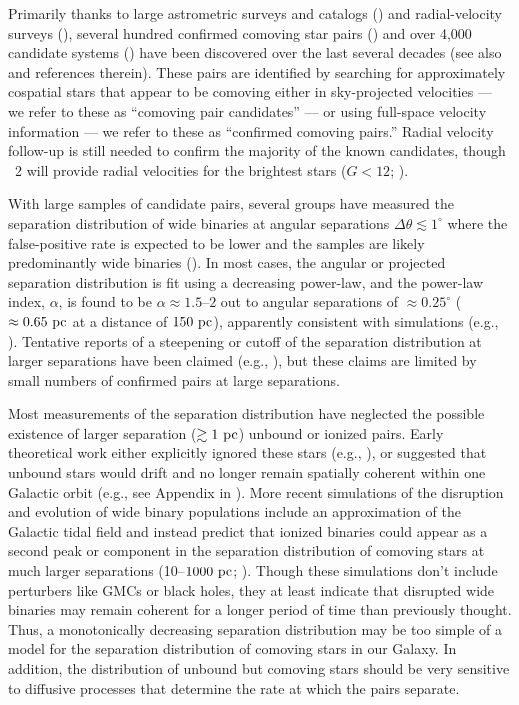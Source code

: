 \documentclass[modern, letterpaper]{aastex61}
\newcommand{\gaia}{\project{Gaia}}
\newcommand{\DR}[1]{\acronym{DR}#1}
\begin{document}
Primarily thanks to large astrometric surveys and catalogs
(\citealt{ESA:1997,Lepine:2005,Gaia-Collaboration:2016}) and radial-velocity
surveys (\citealt{Steinmetz:2006}), several hundred confirmed comoving star
pairs (\citealt{Shaya:2011}) and over 4,000 candidate systems
(\citealt{Gould:2004,Lepine:2007,Tokovinin:2012,Allen:2014,Oh:2017,
Oelkers:2017, Andrews:2017}) have been discovered over the last several decades
(see also \citealt{Chaname:2007} and references therein).
These pairs are identified by searching for approximately cospatial stars that
appear to be comoving either in sky-projected velocities --- we refer to these
as ``comoving pair candidates'' --- or using full-space velocity information ---
we refer to these as ``confirmed comoving pairs.''
Radial velocity follow-up is still needed to confirm the majority of the known
candidates, though \gaia\ \DR{2} will provide radial velocities for the
brightest stars ($G < 12$; \citealt{Gaia-Collaboration:2016}).

With large samples of candidate pairs, several groups have measured the
separation distribution of wide binaries at angular separations $\Delta \theta
\lesssim 1^\circ$ where the false-positive rate is expected to be lower
and the samples are likely predominantly wide binaries
(\citealt{Chaname:2004,Lepine:2007,Sesar:2008}).
In most cases, the angular or projected separation distribution is fit using a
decreasing power-law, and the power-law index, $\alpha$, is found to be $\alpha
\approx 1.5$--$2$ out to angular separations of $\approx 0.25^\circ$ ($\approx
0.65~\mathrm{pc}$ at a distance of $150~\mathrm{pc}$), apparently consistent with simulations
(e.g., \citealt{Weinberg:1987}).
Tentative reports of a steepening or cutoff of the separation distribution at
larger separations have been claimed (e.g., \citealt{Yoo:2004,Quinn:2009}), but
these claims are limited by small numbers of confirmed pairs at large
separations.

Most measurements of the separation distribution have neglected the possible
existence of larger separation ($\gtrsim 1~\mathrm{pc}$) unbound or ionized pairs.
Early theoretical work either explicitly ignored these stars (e.g.,
\citealt{Weinberg:1987}), or suggested that unbound stars would drift and no
longer remain spatially coherent within one Galactic orbit (e.g., see Appendix
in \citealt{Yoo:2004}).
More recent simulations of the disruption and evolution of wide binary
populations include an approximation of the Galactic tidal field and instead
predict that ionized binaries could appear as a second peak or component in the
separation distribution of comoving stars at much larger separations
(10--$1000~\mathrm{pc}$; \citealt{Jiang:2010}).
Though these simulations don't include perturbers like GMCs or black holes, they
at least indicate that disrupted wide binaries may remain coherent for a longer
period of time than previously thought.
Thus, a monotonically decreasing separation distribution may be too simple of a
model for the separation distribution of comoving stars in our Galaxy.
In addition, the distribution of unbound but comoving stars should be very
sensitive to diffusive processes that determine the rate at which the pairs
separate.
\end{document}
